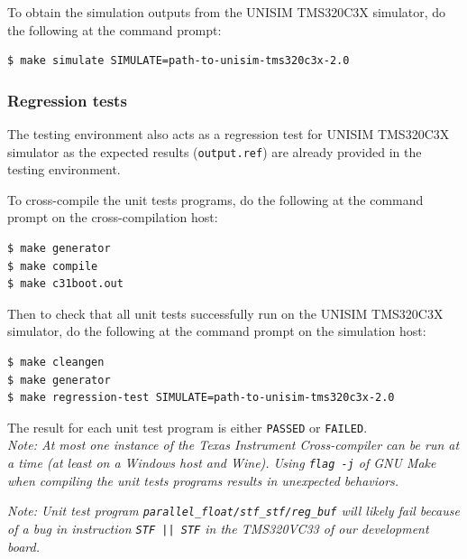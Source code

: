 \vspace{0.5cm}

To obtain the simulation outputs from the UNISIM TMS320C3X simulator, do the following at the command prompt:
\begin{verbatim}
$ make simulate SIMULATE=path-to-unisim-tms320c3x-2.0
\end{verbatim}

\subsubsection{Regression tests}
\label{tms320c3x_regression_tests}

The testing environment also acts as a regression test for UNISIM TMS320C3X simulator as the expected results (\texttt{output.ref}) are already provided in the testing environment.

To cross-compile the unit tests programs, do the following at the command prompt on the cross-compilation host:
\begin{verbatim}
$ make generator
$ make compile
$ make c31boot.out
\end{verbatim}

Then to check that all unit tests successfully run on the UNISIM TMS320C3X simulator, do the following at the command prompt on the simulation host:
\begin{verbatim}
$ make cleangen
$ make generator
$ make regression-test SIMULATE=path-to-unisim-tms320c3x-2.0
\end{verbatim}

\noindent The result for each unit test program is either \texttt{PASSED} or \texttt{FAILED}.\\

\textit{Note: At most one instance of the Texas Instrument Cross-compiler can be run at a time (at least on a Windows host and Wine).
Using \texttt{flag -j} of GNU Make when compiling the unit tests programs results in unexpected behaviors.}

\textit{Note: Unit test program \texttt{parallel\_float/stf\_stf/reg\_buf} will likely fail because of a bug in instruction \texttt{STF || STF} in the TMS320VC33 of our development board.}
